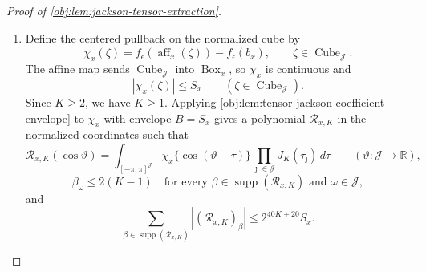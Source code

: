 \documentclass[11pt]{article}
\begin{document}
\begin{proof}[Proof of \cref{obj:lem:jackson-tensor-extraction}]
\begin{enumerate}
Also \(0\le u_{a1}/s_a(u)\le1\) and
\[
0\le s_a(u)-\epsilon s(u)
\le
\{s_a(u)-s_a(w)\}-\epsilon\{s(u)-s(w)\},
\]
which yields
\[
\begin{aligned}
g_{a,\epsilon}(u)-g_{a,\epsilon}(w)
&\ge
\frac{u_{a1}-w_{a1}-s_a(u)+s_a(w)+\epsilon\{s(u)-s(w)\}}{\epsilon}\\
&=
\epsilon^{-1}(w_{a0}-u_{a0})+\{s(u)-s(w)\}\\
&\ge
-(1+\epsilon^{-1})\delta_{\mathcal J}(u,w).
\end{aligned}
\]
Thus, for both arms,
\[
|g_{a,\epsilon}(u)-g_{a,\epsilon}(w)|
\le
(1+\epsilon^{-1})\delta_{\mathcal J}(u,w).
\]
Since
\[
|\max\{\rho_0,\rho_1\}-\max\{\sigma_0,\sigma_1\}|
\le
\max_{a\in\{0,1\}}|\rho_a-\sigma_a|,
\]
\cref{obj:def:global-extension} gives
\[
|\bar f_\epsilon(u)-\bar f_\epsilon(w)|
\le
(1+\epsilon^{-1})\delta_{\mathcal J}(u,w).
\]
Consequently \(\bar f_\epsilon\) is continuous on \(\operatorname{Box}_x\), and for every
\(y\in\operatorname{Box}_x\),
\[
|\bar f_\epsilon(y)-\bar f_\epsilon(b_x)|
\le
(1+\epsilon^{-1})\sum_{\jmath\in\mathcal J}|y_\jmath-b_{\jmath,x}|
\le
(1+\epsilon^{-1})\sum_{\jmath\in\mathcal J}r_{\jmath,x}.
\]
Set
\[
S_x
=
(1+\epsilon^{-1})\sum_{\jmath\in\mathcal J}r_{\jmath,x}.
\]

\item Define the centered pullback on the normalized cube by
\[
\chi_x(\zeta)
=
\bar f_\epsilon(\operatorname{aff}_x(\zeta))-\bar f_\epsilon(b_x),
\qquad
\zeta\in\operatorname{Cube}_{\mathcal J}.
\]
The affine map sends \(\operatorname{Cube}_{\mathcal J}\) into \(\operatorname{Box}_x\), so \(\chi_x\) is continuous and
\[
|\chi_x(\zeta)|\le S_x
\qquad(\zeta\in\operatorname{Cube}_{\mathcal J}).
\]
Since \(K\ge2\), we have \(K\ge1\). Applying \cref{obj:lem:tensor-jackson-coefficient-envelope} to \(\chi_x\) with envelope \(B=S_x\) gives a polynomial \(\mathcal R_{x,K}\) in the normalized coordinates such that
\[
\mathcal R_{x,K}(\cos\vartheta)
=
\int_{[-\pi,\pi]^{\mathcal J}}
\chi_x\{\cos(\vartheta-\tau)\}
\prod_{\jmath\in\mathcal J}J_K(\tau_\jmath)\,d\tau
\qquad(\vartheta:\mathcal J\to\mathbb R),
\]
\[
\beta_\omega\le 2(K-1)
\quad
\text{for every }\beta\in\operatorname{supp}(\mathcal R_{x,K})
\text{ and }\omega\in\mathcal J,
\]
and
\[
\sum_{\beta\in\operatorname{supp}(\mathcal R_{x,K})}
|(\mathcal R_{x,K})_\beta|
\le
2^{40K+20}S_x .
\]


\end{enumerate}
\end{proof}
\end{document}
